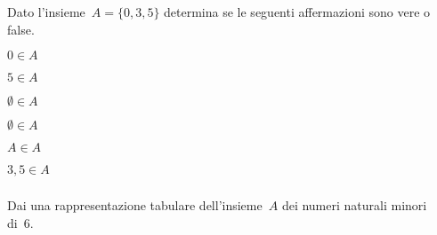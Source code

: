 
\begin{esercizio}
\label{ese:5.15}
Dato l'insieme~$A = {\{0, 3, 5\}}$ determina se le seguenti affermazioni sono 
vere o false.
\begin{multicols}{3}
\begin{enumeratea}
\item $0\in A$ \hfill \boxV\quad\boxF
\item $5\in A$ \hfill \boxV\quad\boxF
\item $\emptyset \in A$ \hfill \boxV\quad\boxF
\item $\emptyset\in A$ \hfill \boxV\quad\boxF
\item $A\in A$ \hfill \boxV\quad\boxF
\item $3,5\in A$ \hfill \boxV\quad\boxF
\end{enumeratea}
\end{multicols}
\end{esercizio}


\subsubsection*{}

\begin{esercizio}
\label{ese:6.1}
Dai una rappresentazione tabulare dell'insieme~$A$ dei numeri naturali minori 
di~6.
\end{esercizio}


